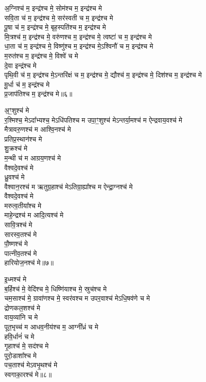 अ॒ग्निश्च॑ म॒ इन्द्र॑श्च मे॒ सोम॑श्च म॒ इन्द्र॑श्च मे\\
सवि॒ता च॑ म॒ इन्द्र॑श्च मे॒ सर॑स्वती च म॒ इन्द्र॑श्च मे\\
पू॒षा च॑ म॒ इन्द्र॑श्च मे॒ बृह॒स्पति॑श्च म॒ इन्द्र॑श्च मे\\
मि॒त्रश्च॑ म॒ इन्द्र॑श्च मे॒ वरु॑णश्च म॒ इन्द्र॑श्च मे॒ त्वष्टा॑ च म॒ इन्द्र॑श्च मे\\
धा॒ता च॑ म॒ इन्द्र॑श्च मे॒ विष्णु॑श्च म॒ इन्द्र॑श्च मे॒ऽश्विनौ॑ च म॒ इन्द्र॑श्च मे\\
म॒रुत॑श्च म॒ इन्द्र॑श्च मे॒ विश्वे॑ च मे\\
दे॒वा इन्द्र॑श्च मे\\
पृथि॒वी च॑ म॒ इन्द्र॑श्च मे॒ऽन्तरि॑क्षं च म॒ इन्द्र॑श्च मे॒ द्यौश्च॑ म॒ इन्द्र॑श्च मे॒ दिश॑श्च म॒ इन्द्र॑श्च मे\\
मू॒र्धा च॑ म॒ इन्द्र॑श्च मे\\
प्र॒जाप॑तिश्च म॒ इन्द्र॑श्च मे॥६॥ 

अ॒ꣳ॒शुश्च॑ मे\\
र॒श्मिश्च॒ मेऽदा᳚भ्यश्च॒ मेऽधि॑पतिश्च म उपा॒ꣳ॒शुश्च॑ मेऽन्तर्या॒मश्च॑ म ऐन्द्रवाय॒वश्च॑ मे\\
मैत्रावरु॒णश्च॑ म आश्वि॒नश्च॑ मे\\
प्रतिप्र॒स्थान॑श्च मे\\
शु॒क्रश्च॑ मे\\
म॒न्थी च॑ म आग्रय॒णश्च॑ मे\\
वैश्वदे॒वश्च॑ मे\\
ध्रु॒वश्च॑ मे\\
वैश्वान॒रश्च॑ म ऋतुग्र॒हाश्च॑ मेऽतिग्रा॒ह्या᳚श्च म ऐन्द्रा॒ग्नश्च॑ मे\\
वैश्वदे॒वश्च॑ मे\\
मरुत्व॒तीया᳚श्च मे\\
माहे॒न्द्रश्च॑ म आदि॒त्यश्च॑ मे\\
सावि॒त्रश्च॑ मे\\
सारस्व॒तश्च॑ मे\\
पौ॒ष्णश्च॑ मे\\
पात्नीव॒तश्च॑ मे\\
हारियोज॒नश्च॑ मे॥७॥ 

इ॒ध्मश्च॑ मे\\
ब॒र्हिश्च॑ मे॒ वेदि॑श्च मे॒ धिष्णि॑याश्च मे॒ स्रुच॑श्च मे\\
चम॒साश्च॑ मे॒ ग्रावा॑णश्च मे॒ स्वर॑वश्च म उपर॒वाश्च॑ मेऽधि॒षव॑णे च मे\\
द्रोणकल॒शश्च॑ मे\\
वाय॒व्या॑नि च मे\\
पूत॒भृच्च॑ म आधव॒नीय॑श्च म॒ आग्नी᳚ध्रं च मे\\
हवि॒र्धानं॑ च मे\\
गृ॒हाश्च॑ मे॒ सद॑श्च मे\\
पुरो॒डाशा᳚श्च मे\\
पच॒ताश्च॑ मेऽवभृ॒थश्च॑ मे\\
स्वगाका॒रश्च॑ मे॥८॥ 

